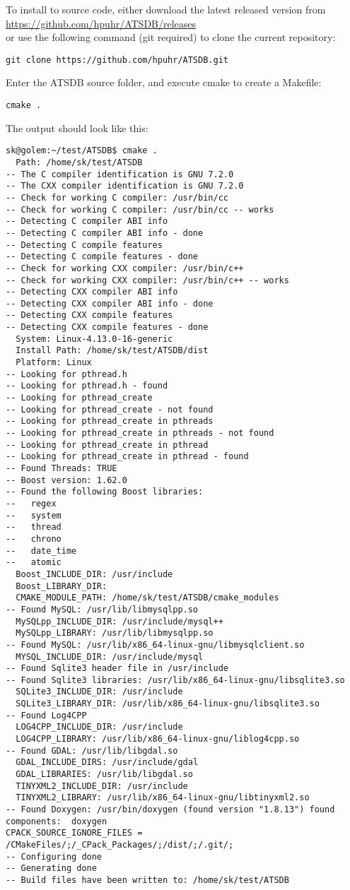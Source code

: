 To install to source code, either download the latest released version from \\ \url{https://github.com/hpuhr/ATSDB/releases} \\
or use the following command (git required) to clone the current repository:

\begin{verbatim}
git clone https://github.com/hpuhr/ATSDB.git
\end{verbatim}

Enter the ATSDB source folder, and execute cmake to create a Makefile:

\begin{verbatim}
cmake .
\end{verbatim}

The output should look like this:
\begin{verbatim}
sk@golem:~/test/ATSDB$ cmake .
  Path: /home/sk/test/ATSDB
-- The C compiler identification is GNU 7.2.0
-- The CXX compiler identification is GNU 7.2.0
-- Check for working C compiler: /usr/bin/cc
-- Check for working C compiler: /usr/bin/cc -- works
-- Detecting C compiler ABI info
-- Detecting C compiler ABI info - done
-- Detecting C compile features
-- Detecting C compile features - done
-- Check for working CXX compiler: /usr/bin/c++
-- Check for working CXX compiler: /usr/bin/c++ -- works
-- Detecting CXX compiler ABI info
-- Detecting CXX compiler ABI info - done
-- Detecting CXX compile features
-- Detecting CXX compile features - done
  System: Linux-4.13.0-16-generic
  Install Path: /home/sk/test/ATSDB/dist
  Platform: Linux
-- Looking for pthread.h
-- Looking for pthread.h - found
-- Looking for pthread_create
-- Looking for pthread_create - not found
-- Looking for pthread_create in pthreads
-- Looking for pthread_create in pthreads - not found
-- Looking for pthread_create in pthread
-- Looking for pthread_create in pthread - found
-- Found Threads: TRUE  
-- Boost version: 1.62.0
-- Found the following Boost libraries:
--   regex
--   system
--   thread
--   chrono
--   date_time
--   atomic
  Boost_INCLUDE_DIR: /usr/include
  Boost_LIBRARY_DIR: 
  CMAKE_MODULE_PATH: /home/sk/test/ATSDB/cmake_modules
-- Found MySQL: /usr/lib/libmysqlpp.so
  MySQLpp_INCLUDE_DIR: /usr/include/mysql++
  MySQLpp_LIBRARY: /usr/lib/libmysqlpp.so
-- Found MySQL: /usr/lib/x86_64-linux-gnu/libmysqlclient.so
  MYSQL_INCLUDE_DIR: /usr/include/mysql
-- Found Sqlite3 header file in /usr/include
-- Found Sqlite3 libraries: /usr/lib/x86_64-linux-gnu/libsqlite3.so
  SQLite3_INCLUDE_DIR: /usr/include
  SQLite3_LIBRARY_DIR: /usr/lib/x86_64-linux-gnu/libsqlite3.so
-- Found Log4CPP
  LOG4CPP_INCLUDE_DIR: /usr/include
  LOG4CPP_LIBRARY: /usr/lib/x86_64-linux-gnu/liblog4cpp.so
-- Found GDAL: /usr/lib/libgdal.so  
  GDAL_INCLUDE_DIRS: /usr/include/gdal
  GDAL_LIBRARIES: /usr/lib/libgdal.so
  TINYXML2_INCLUDE_DIR: /usr/include
  TINYXML2_LIBRARY: /usr/lib/x86_64-linux-gnu/libtinyxml2.so
-- Found Doxygen: /usr/bin/doxygen (found version "1.8.13") found components:  doxygen 
CPACK_SOURCE_IGNORE_FILES = /CMakeFiles/;/_CPack_Packages/;/dist/;/.git/;
-- Configuring done
-- Generating done
-- Build files have been written to: /home/sk/test/ATSDB
\end{verbatim}

